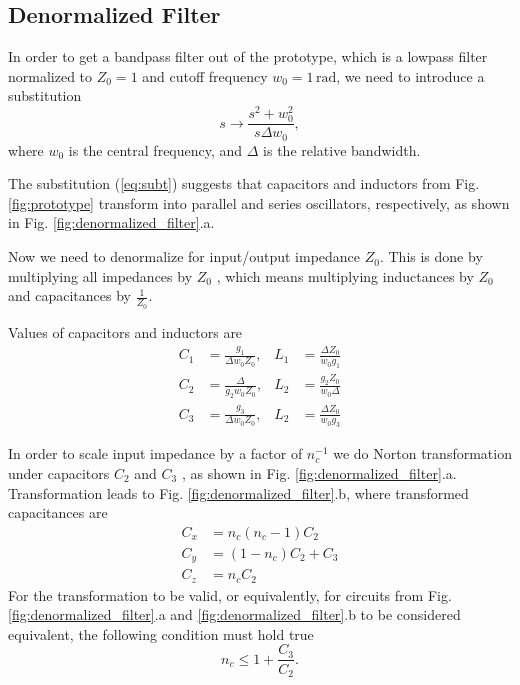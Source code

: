 \documentclass[lettersize,journal]{IEEEtran}
\begin{document}
\subsection{Denormalized Filter}

In order to get a bandpass filter out of the prototype, which is a lowpass filter normalized to $Z_0 = 1$ and cutoff frequency $w_0 = 1 \, \text{rad}$, we need to introduce a substitution
%
\begin{equation}
	\label{eq:subt}
	s \to \frac{s^2 + w_0^2}{s \Delta w_0},
\end{equation}
%
where $w_0$ is the central frequency, and $\Delta$ is the relative bandwidth.

The substitution (\ref{eq:subt}) suggests that capacitors and inductors from Fig. \ref{fig:prototype} transform into parallel and series oscillators, respectively, as shown in Fig. \ref{fig:denormalized_filter}.a.

Now we need to denormalize for input/output impedance $Z_0$. This is done by multiplying all impedances by $Z_0$ , which
means multiplying inductances by $Z_0$ and capacitances by $\frac{1}{Z_0}$.

Values of capacitors and inductors are
%
\begin{subequations} \label{eq:denom_all}
	\begin{align}
		C_1 &= \frac{g_1}{\Delta w_0 Z_0}, & L_1 &= \frac{\Delta Z_0}{w_0 g_1} \label{eq:denom_1} \\
		C_2 &= \frac{\Delta}{g_2 w_0 Z_0}, & L_2 &= \frac{g_2 Z_0}{w_0 \Delta} \label{eq:denom_2} \\
		C_3 &= \frac{g_3}{\Delta w_0 Z_0}, & L_2 &= \frac{\Delta Z_0}{w_0 g_3} \label{eq:denom_3}
	\end{align}
\end{subequations}

In order to scale input impedance by a factor of $n_c^{-1}$ we do Norton transformation under capacitors $C_2$ and $C_3$ , as shown in Fig. \ref{fig:denormalized_filter}.a. Transformation leads to Fig. \ref{fig:denormalized_filter}.b, where transformed capacitances are
%
\begin{subequations} \label{eq:norton_all}
	\begin{align}
		C_x &= n_c (n_c - 1) C_2 \label{eq:norton_x} \\
		C_y &= (1 - n_c) C_2 + C_3 \label{eq:norton_y} \\
		C_z &= n_c C_2 \label{eq:norton_z}
	\end{align}
\end{subequations}
%
For the transformation to be valid, or equivalently, for circuits from Fig. \ref{fig:denormalized_filter}.a and \ref{fig:denormalized_filter}.b to be considered equivalent, the following condition must hold true
%
\begin{equation}
	\label{eq:norton_cond}
	n_c \leq 1 + \frac{C_3}{C_2}.
\end{equation}
\end{document}
